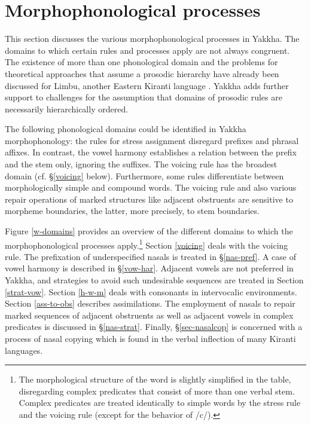\section{Morphophonological processes}\label{morphophon}



This section discusses the various morphophonological processes in Yakkha. The domains to which certain rules and processes apply are not always congruent. The existence of more than one phonological domain and the problems for theoretical approaches that assume a prosodic hierarchy have already been discussed for Limbu, another Eastern Kiranti language  \citep{Hildebrandt2007Prosodic, Schieringetal2010The-prosodic}. Yakkha adds further support to challenges for the assumption that domains of prosodic rules are necessarily hierarchically ordered. 

The following phonological domains could be identified in Yakkha morpho\-pho\-no\-logy: the rules for stress assignment disregard prefixes and phrasal affixes. In contrast, the vowel harmony establishes a relation between the prefix and the stem only, ignoring the suffixes. The voicing rule has the broadest domain (cf. §\ref{voicing} below). Furthermore, some rules differentiate between morphologically simple and compound words. The voicing rule and also various repair operations of marked structures like adjacent obstruents are sensitive to morpheme boundaries, the latter, more precisely,  to stem boundaries. 

Figure  \ref{w-domains} provides an overview of the different domains to which the morphophonological processes apply.\footnote{The morphological structure of the word is slightly simplified in the table, disregarding complex predicates that consist of more than one verbal stem. Complex predicates are treated identically to simple words by the stress rule and the voicing rule (except for the behavior of /c/).} Section \ref{voicing} deals with  the voicing rule. The prefixation of underspecified nasals is treated in §\ref{nas-pref}. A case of vowel harmony is described in §\ref{vow-har}. Adjacent vowels are not preferred in Yakkha, and strategies to avoid such undesirable sequences are treated in Section \ref{strat-vow}. Section \ref{h-w-m} deals with consonants in intervocalic environments. Section \ref{ass-to-obs} describes assimilations. The employment of nasals to repair marked sequences of adjacent obstruents as well as adjacent vowels in complex predicates is discussed in §\ref{nas-strat}. Finally, §\ref{sec-nasalcop} is concerned with a process of nasal copying which is found in the verbal inflection of many Kiranti languages.


